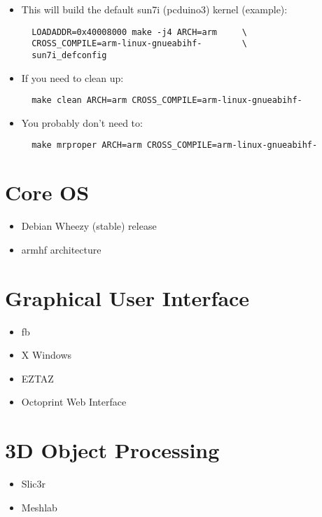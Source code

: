 \begin{itemize}
  \item{This will build the default sun7i (pcduino3) kernel (example):
  
  \begin{verbatim}
  LOADADDR=0x40008000 make -j4 ARCH=arm		\
  CROSS_COMPILE=arm-linux-gnueabihf-		\
  sun7i_defconfig
  \end{verbatim}
  }

  \item{If you need to clean up:
  
  \begin{verbatim}
  make clean ARCH=arm CROSS_COMPILE=arm-linux-gnueabihf-
  \end{verbatim}
  }

  \item{You probably don't need to:
  
  \begin{verbatim}
  make mrproper ARCH=arm CROSS_COMPILE=arm-linux-gnueabihf-
  \end{verbatim}
  }
\end{itemize}


\section{Core OS}
\begin{itemize}
  \item{Debian Wheezy (stable) release}
  \item{armhf architecture}
\end{itemize}


\section{Graphical User Interface}

\begin{itemize}
  \item{fb}
  \item{X Windows}
  \item{EZTAZ}
  \item{Octoprint Web Interface}
\end{itemize}

\section{3D Object Processing}

\begin{itemize}
  \item{Slic3r}
  \item{Meshlab}
\end{itemize}

